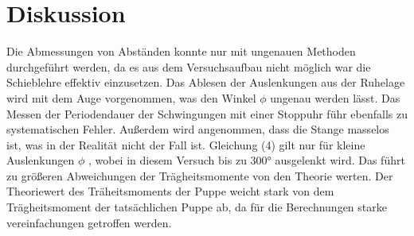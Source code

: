 \section{Diskussion}
\label{sec:Diskussion}
Die Abmessungen von Abständen konnte nur mit ungenauen Methoden durchgeführt werden,
da es aus dem Versuchsaufbau nicht möglich war die Schieblehre effektiv einzusetzen.
Das Ablesen der Auslenkungen aus der Ruhelage wird mit dem Auge vorgenommen, was
den Winkel $\phi$ ungenau werden lässt. Das Messen der Periodendauer der
Schwingungen mit einer Stoppuhr führ ebenfalls zu systematischen Fehler.
Außerdem wird angenommen, dass die Stange masselos ist, was in der Realität
nicht der Fall ist. Gleichung (4) gilt nur für kleine Auslenkungen $\phi$ , wobei
in diesem Versuch bis zu 300° ausgelenkt wird. Das führt zu größeren Abweichungen
der Trägheitsmomente von den Theorie werten. Der Theoriewert des Träheitsmoments
der Puppe weicht stark von dem Trägheitsmoment der tatsächlichen Puppe ab, da für die
Berechnungen starke vereinfachungen getroffen werden.
